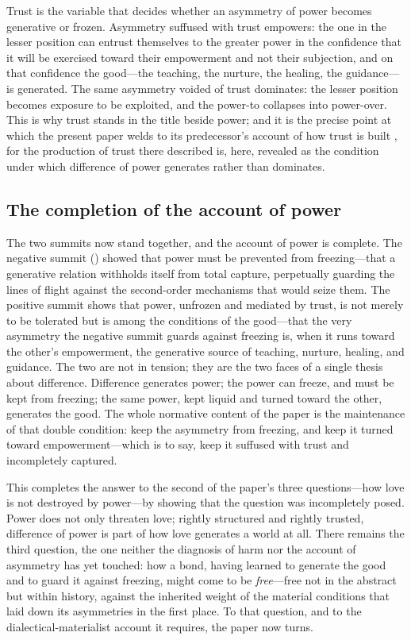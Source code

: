 \begin{claim}
Trust is the variable that decides whether an asymmetry of power becomes generative or frozen. Asymmetry suffused with trust empowers: the one in the lesser position can entrust themselves to the greater power in the confidence that it will be exercised toward their empowerment and not their subjection, and on that confidence the good---the teaching, the nurture, the healing, the guidance---is generated. The same asymmetry voided of trust dominates: the lesser position becomes exposure to be exploited, and the power-to collapses into power-over. This is why trust stands in the title beside power; and it is the precise point at which the present paper welds to its predecessor's account of how trust is built \parencite{paperxiii}, for the production of trust there described is, here, revealed as the condition under which difference of power generates rather than dominates.
\end{claim}

\subsection{The completion of the account of power}
\label{p17:sub:asymmetry-completion}

The two summits now stand together, and the account of power is complete. The negative summit () showed that power must be prevented from freezing---that a generative relation withholds itself from total capture, perpetually guarding the lines of flight against the second-order mechanisms that would seize them. The positive summit shows that power, unfrozen and mediated by trust, is not merely to be tolerated but is among the conditions of the good---that the very asymmetry the negative summit guards against freezing is, when it runs toward the other's empowerment, the generative source of teaching, nurture, healing, and guidance. The two are not in tension; they are the two faces of a single thesis about difference. Difference generates power; the power can freeze, and must be kept from freezing; the same power, kept liquid and turned toward the other, generates the good. The whole normative content of the paper is the maintenance of that double condition: keep the asymmetry from freezing, and keep it turned toward empowerment---which is to say, keep it suffused with trust and incompletely captured.

This completes the answer to the second of the paper's three questions---how love is not destroyed by power---by showing that the question was incompletely posed. Power does not only threaten love; rightly structured and rightly trusted, difference of power is part of how love generates a world at all. There remains the third question, the one neither the diagnosis of harm nor the account of asymmetry has yet touched: how a bond, having learned to generate the good and to guard it against freezing, might come to be \emph{free}---free not in the abstract but within history, against the inherited weight of the material conditions that laid down its asymmetries in the first place. To that question, and to the dialectical-materialist account it requires, the paper now turns.
